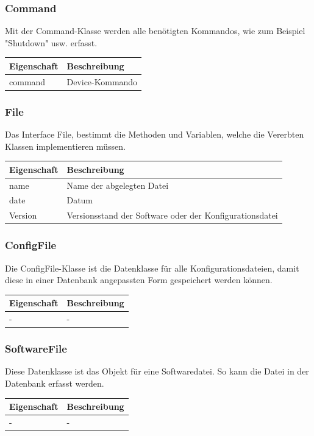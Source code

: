 \subsubsection{Command}
Mit der Command-Klasse werden alle benötigten Kommandos, wie zum Beispiel "Shutdown" usw. erfasst.
\begin{table}[H]
\centering
    \begin{tabular}{@{}l p{14.1cm} @{}}\toprule    
    {Eigenschaft} & {Beschreibung}\\ \midrule      
    command & Device-Kommando\\
    \bottomrule
    \end{tabular}
\end{table}


\subsubsection{File}
Das Interface File, bestimmt die Methoden und Variablen, welche die Vererbten Klassen implementieren müssen.
\begin{table}[H]
\centering
    \begin{tabular}{@{}l p{14.1cm} @{}}\toprule    
    {Eigenschaft} & {Beschreibung}\\ \midrule      
    name & Name der abgelegten Datei\\
    date & Datum\\ 
    Version & Versionsstand der Software oder der Konfigurationsdatei\\
    \bottomrule
    \end{tabular}
\end{table}


\subsubsection{ConfigFile}
Die ConfigFile-Klasse ist die Datenklasse für alle Konfigurationsdateien, damit diese in einer Datenbank angepassten Form gespeichert werden können. \begin{table}[H]
\centering
    \begin{tabular}{@{}l p{14.1cm} @{}}\toprule    
    {Eigenschaft} & {Beschreibung}\\ \midrule      
    - & -\\
    \bottomrule
    \end{tabular}
\end{table}



\subsubsection{SoftwareFile}
Diese Datenklasse ist das Objekt für eine Softwaredatei. So kann die Datei in der Datenbank erfasst werden.
\begin{table}[H]
\centering
    \begin{tabular}{@{}l p{14.1cm} @{}}\toprule    
    {Eigenschaft} & {Beschreibung}\\ \midrule      
    - & -\\
    \bottomrule
    \end{tabular}
\end{table}



